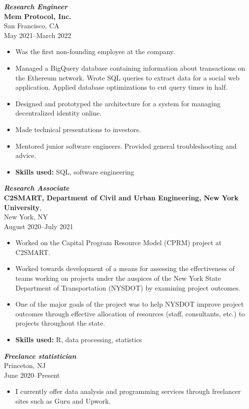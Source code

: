 \documentclass[letterpaper,12pt]{article}
\begin{document}
\textit{\textbf{Research Engineer}} \\
\textbf{Mem Protocol, Inc.} \\
San Francisco, CA \\
May 2021--March 2022
\begin{itemize}
	\item Was the first non-founding employee at the company.
	\item Managed a BigQuery database containing information about transactions 
	on the Ethereum network. Wrote SQL queries to extract data for a social web 
	application. Applied database optimizations to cut query times in half.
	\item Designed and prototyped the architecture for a system for managing 
	decentralized identity online.
	\item Made technical presentations to investors.
	\item Mentored junior software engineers. Provided general troubleshooting 
	and advice.
	\item \textbf{Skills used:} SQL, software engineering
\end{itemize}

\textit{\textbf{Research Associate}} \\
\textbf{C2SMART, Department of Civil and Urban Engineering,
  New York University}, \\
New York, NY \\
August 2020--July 2021
\begin{itemize}
\item Worked on the Capital Program Resource Model (CPRM)
  project at C2SMART.
\item Worked towards development of a means for assessing the
  effectiveness of teams working on projects under the auspices of the
  New York State Department of Transportation (NYSDOT) by examining
  project outcomes.
\item One of the major goals of the project was to help NYSDOT improve
  project outcomes through effective allocation of resources (staff,
  consultants, etc.) to projects throughout the state.
\item \textbf{Skills used:} R, data processing, statistics
\end{itemize}

\iffalse
\textit{\textbf{Freelance statistician}} \\
Princeton, NJ \\
June 2020--Present
\begin{itemize}
\item I currently offer data analysis and programming services through
  freelancer sites such as Guru and Upwork.
\end{itemize}
\end{document}
